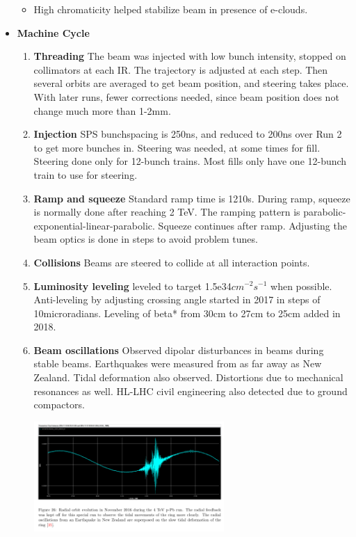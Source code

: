 \begin{itemize}
\begin{itemize}
        \item High chromaticity helped stabilize beam in presence of e-clouds. \cite{lhcRun2}
    \end{itemize}
    \item \textbf{Machine Cycle} \cite{lhcRun2}
    \begin{enumerate}
        \item \textbf{Threading} The beam was injected with low bunch intensity, stopped on collimators at each IR. The trajectory is adjusted at each step. Then several orbits are averaged to get beam position, and steering takes place. With later runs, fewer corrections needed, since beam position does not change much more than 1-2mm. \cite{lhcRun2}
        \item \textbf{Injection} SPS bunchspacing is 250ns, and reduced to 200ns over Run 2 to get more bunches in. Steering was needed, at some times for fill. Steering done only for 12-bunch trains. Most fills only have one 12-bunch train to use for steering. \cite{lhcRun2}
        \item \textbf{Ramp and squeeze} Standard ramp time is 1210s. During ramp, squeeze is normally done after reaching 2 TeV. The ramping pattern is parabolic-exponential-linear-parabolic. Squeeze continues after ramp. Adjusting the beam optics is done in steps to avoid problem tunes. \cite{lhcRun2}
        \item \textbf{Collisions} Beams are steered to collide at all interaction points. \cite{lhcRun2}
        \item \textbf{Luminosity leveling} leveled to target 1.5e34$cm^{-2}s^{-1}$ when possible. Anti-leveling by adjusting crossing angle started in 2017 in steps of 10microradians. Leveling of beta* from 30cm to 27cm to 25cm added in 2018. \cite{lhcRun2}
        \item \textbf{Beam oscillations} Observed dipolar disturbances in beams during stable beams. Earthquakes were measured from as far away as New Zealand. Tidal deformation also observed. Distortions due to mechanical resonances as well. HL-LHC civil engineering also detected due to ground compactors. \\ \cite{lhcRun2}
        \begin{center}
        \includegraphics[width=0.6\textwidth]{figures/experiment/orbit.png}

\end{center}
\end{enumerate}
\end{itemize}
